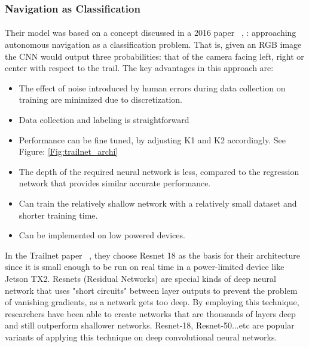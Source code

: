 \newpage
\subsubsection{Navigation as Classification} 

\paragraph{}
Their model was based on a concept discussed in a 2016 paper ~\cite{trailnet},
: approaching autonomous navigation as a classification problem. That is, given an RGB image the CNN would output three probabilities: that of the camera facing left, right or center with respect to the trail. The key advantages in this approach are:

\begin{itemize}
    \item The effect of noise introduced by human errors during data collection on training are minimized due to discretization.
    \item Data collection and labeling is straightforward
    \item Performance can be fine tuned, by adjusting K1 and K2 accordingly. See Figure: \ref{Fig:trailnet_archi}
    \item The depth of the required neural network is less, compared to the regression network that provides similar accurate performance.
    \item Can train the relatively shallow network with a relatively small dataset and shorter training time.
    \item Can be implemented on low powered devices.
\end{itemize}

In the Trailnet paper ~\cite{trailnet}, they choose Resnet 18 as the basis for their architecture since it is small enough to be run on real time in a power-limited device like Jetson TX2. Resnets (Residual Networks) are special kinds of deep neural network that uses "short circuits" between layer outputs to prevent the problem of vanishing gradients, as a network gets too deep. By employing this technique, researchers have been able to create networks that are thousands of layers deep and still outperform shallower networks. Resnet-18, Resnet-50...etc are popular variants of applying this technique on deep convolutional neural networks.

